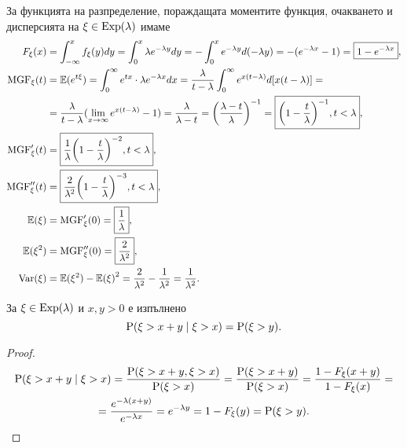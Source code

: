 \documentclass[numbers=endperiod, DIV=15, bibliography=totocnumbered]{scrartcl}
\begin{document}
За функцията на разпределение, пораждащата моментите функция, очакването и дисперсията на $\xi \in \operatorname{Exp}(\lambda)$ имаме
\begingroup
\allowdisplaybreaks
\begin{align*}
  F_\xi(x)
  &=
  \int_{-\infty}^x f_\xi(y) dy
  =
  \int_0^x \lambda e^{-\lambda y} dy
  =
  -\int_0^x e^{-\lambda y} d(-\lambda y)
  =
  -(e^{-\lambda x} - 1)
  =
  \boxed{1 - e^{-\lambda x}},
  \\
  \operatorname{MGF}_\xi(t)
  &=
  \mathbb{E}(e^{t\xi})
  =
  \int_0^\infty e^{tx} \cdot \lambda e^{-\lambda x} dx
  =
  \frac \lambda {t-\lambda} \int_0^\infty e^{x(t-\lambda)} d[x(t-\lambda)]
  = \\ &=
  \frac \lambda {t-\lambda} (\lim_{x \to \infty} e^{x(t-\lambda)} - 1)
  =
  \frac \lambda {\lambda-t}
  =
  {\left(\frac {\lambda-t} \lambda \right)}^{-1}
  =
  \boxed{{\left(1 - \frac t \lambda \right)}^{-1}, t < \lambda},
  \\
  \operatorname{MGF}'_\xi(t)
  &=
  \boxed{\frac 1 \lambda {\left(1 - \frac t \lambda \right)}^{-2}, t < \lambda},
  \\
  \operatorname{MGF}''_\xi(t)
  &=
  \boxed{\frac 2 {\lambda^2} {\left(1 - \frac t \lambda \right)}^{-3}, t < \lambda},
  \\
  \mathbb{E}(\xi)
  &=
  \operatorname{MGF}'_\xi(0)
  =
  \boxed{\frac 1 \lambda},
  \\
  \mathbb{E}(\xi^2)
  &=
  \operatorname{MGF}''_\xi(0)
  =
  \boxed{\frac 2 {\lambda^2}},
  \\
  \operatorname{Var}(\xi)
  &=
  \mathbb{E}(\xi^2) - {\mathbb{E}(\xi)}^2
  =
  \frac 2 {\lambda^2} - \frac 1 {\lambda^2}
  =
  \frac 1 {\lambda^2}.
\end{align*}
\endgroup

\begin{theorem}\label{thm:memorylessness}
  За $\xi \in \operatorname{Exp}(\lambda)$ и $x, y > 0$ е изпълнено
  \begin{displaymath}
    \operatorname{P}(\xi > x + y \mid \xi > x) = \operatorname{P}(\xi > y).
  \end{displaymath}
\end{theorem}
\begin{proof}
  \begin{multline*}
    \operatorname{P}(\xi > x + y \mid \xi > x)
    =
    \frac {\operatorname{P}(\xi > x + y, \xi > x)} {\operatorname{P}(\xi > x)}
    =
    \frac {\operatorname{P}(\xi > x + y)} {\operatorname{P}(\xi > x)}
    =
    \frac {1-F_\xi(x+y)} {1-F_\xi(x)}
    = \\ =
    \frac {e^{-\lambda(x+y)}} {e^{-\lambda x}}
    =
    e^{-\lambda y}
    =
    1-F_\xi(y)
    =
    \operatorname{P}(\xi > y).
  \end{multline*}
\end{proof}
\end{document}
